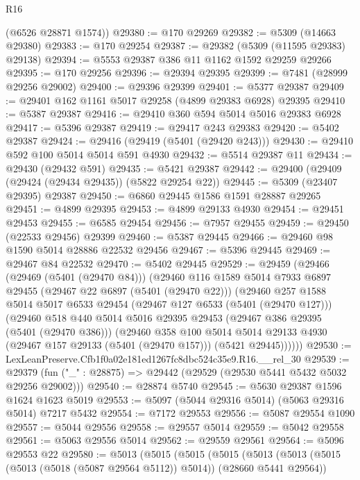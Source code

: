 \begin{lexlean}{R16}
\begin{coremodule}
      (@6526 @28871 @1574))
@29380 := @170 @29269
@29382 := @5309 (@14663 @29380)
@29383 := @170 @29254
@29387 := @29382 (@5309 (@11595 @29383) @29138)
@29394 := @5553 @29387 @386 @11 @1162 @1592 @29259 @29266
@29395 := @170 @29256
@29396 := @29394 @29395
@29399 := @7481 (@28999 @29256 @29002)
@29400 := @29396 @29399
@29401 := @5377 @29387
@29409 := @29401 @162 @1161 @5017 @29258 (@4899 @29383 @6928) @29395
@29410 := @5387 @29387
@29416 := @29410 @360 @594 @5014 @5016 @29383 @6928
@29417 := @5396 @29387
@29419 := @29417 @243 @29383
@29420 := @5402 @29387
@29424 := @29416 (@29419 (@5401 (@29420 @243)))
@29430 := @29410 @592 @100 @5014 @5014 @591 @4930
@29432 := @5514 @29387 @11
@29434 := @29430 (@29432 @591)
@29435 := @5421 @29387
@29442 := @29400 (@29409 (@29424 (@29434 @29435)) (@5822 @29254 @22))
@29445 := @5309 (@23407 @29395) @29387
@29450 := @6860 @29445 @1586 @1591 @28887 @29265
@29451 := @4899 @29395
@29453 := @4899 @29133 @4930
@29454 := @29451 @29453
@29455 := @6585 @29454
@29456 := @7957 @29455
@29459 := @29450 (@22533 @29456) @29399
@29460 := @5387 @29445
@29466 := @29460 @98 @1590 @5014 @28886 @22532 @29456
@29467 := @5396 @29445
@29469 := @29467 @84 @22532
@29470 := @5402 @29445
@29529 := @29459
    (@29466
      (@29469 (@5401 (@29470 @84)))
      (@29460
        @116
        @1589
        @5014
        @7933
        @6897
        @29455
        (@29467 @22 @6897 (@5401 (@29470 @22)))
        (@29460
          @257
          @1588
          @5014
          @5017
          @6533
          @29454
          (@29467 @127 @6533 (@5401 (@29470 @127)))
          (@29460
            @518
            @440
            @5014
            @5016
            @29395
            @29453
            (@29467 @386 @29395 (@5401 (@29470 @386)))
            (@29460
              @358
              @100
              @5014
              @5014
              @29133
              @4930
              (@29467 @157 @29133 (@5401 (@29470 @157)))
              (@5421 @29445))))))
@29530 := LexLeanPreserve.Cfb1f0a02e181ed1267fc8dbc524c35e9.R16.__rel_30
@29539 := @29379 (fun ("_" : @28875) => @29442 (@29529 (@29530 @5441 @5432 @5032 @29256 @29002)))
@29540 := @28874 @5740
@29545 := @5630 @29387 @1596 @1624 @1623 @5019
@29553 := @5097 (@5044 @29316 @5014) (@5063 @29316 @5014) @7217 @5432
@29554 := @7172 @29553
@29556 := @5087 @29554 @1090
@29557 := @5044 @29556
@29558 := @29557 @5014
@29559 := @5042 @29558
@29561 := @5063 @29556 @5014
@29562 := @29559 @29561
@29564 := @5096 @29553 @22
@29580 := @5013
    (@5015
      (@5015
        (@5015
          (@5013
            (@5013 (@5015 (@5013 (@5018 (@5087 @29564 @5112)) @5014)) (@28660 @5441 @29564))

\end{coremodule}
\end{lexlean}
